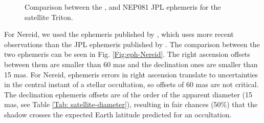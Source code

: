 \begin{figure}
\begin{centering}
\caption{Comparison between the \cite{Emelyanov2015}, \cite{Zhang2014} and NEP081 JPL \citep{Jacobson2009} ephemeris for the satellite Triton.}
\label{Fig:eph-Triton}
\end{centering}
\end{figure}

For Nereid, we used the ephemeris published by \cite{Emelyanov2011}, which uses more recent observations than the JPL ephemeris published by \cite{Jacobson2009}. The comparison between the two ephemeris can be seen in Fig. \ref{Fig:eph-Nereid}. The right ascension offsets between them are smaller than 60 mas and the declination ones are smaller than 15 mas. For Nereid, ephemeris errors in right ascension translate to uncertainties in the central instant of a stellar occultation, so offsets of 60 mas are not critical. The declination ephemeris offsets are of the order of the apparent diameter (15 mas, see Table \ref{Tab: satellite-diameter}), resulting in fair chances (50\%) that the shadow crosses the expected Earth latitude predicted for an occultation. %

